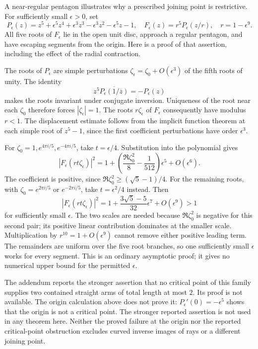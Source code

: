 A near-regular pentagon illustrates why a prescribed joining point is
restrictive. For sufficiently small $\epsilon>0$, set
\[
 P_\epsilon(z)=z^5+\epsilon^5z^4+\epsilon^3z^3
              -\epsilon^3z^2-\epsilon^5z-1,
 \quad F_\epsilon(z)=r^5P_\epsilon(z/r),\quad r=1-\epsilon^9.
\]
All five roots of $F_\epsilon$ lie in the open unit disc, approach a
regular pentagon, and have escaping segments from the origin. Here is a
proof of that assertion, including the effect of the radial contraction.

The roots of $P_\epsilon$ are simple perturbations
$\zeta_\epsilon=\zeta_0+O(\epsilon^3)$ of the fifth roots of unity.
The identity
\[
 z^5\overline{P_\epsilon(1/\overline z)}=-P_\epsilon(z)
\]
makes the roots invariant under conjugate inversion. Uniqueness of the
root near each $\zeta_0$ therefore forces $|\zeta_\epsilon|=1$.
The roots $r\zeta_\epsilon$ of $F_\epsilon$ consequently have modulus
$r<1$. The displacement estimate follows from the implicit function
theorem at each simple root of $z^5-1$, since the first coefficient
perturbations have order $\epsilon^3$.

For $\zeta_0=1,e^{4\pi i/5},e^{-4\pi i/5}$, take $t=\epsilon/4$.
Substitution into the polynomial gives
\[
 |F_\epsilon(rt\zeta_\epsilon)|^2
 =1+\left(\frac{\Re\zeta_0^2}{8}-\frac1{512}\right)\epsilon^5
       +O(\epsilon^6).
\]
The coefficient is positive, since
$\Re\zeta_0^2\ge(\sqrt5-1)/4$.
For the remaining roots, with $\zeta_0=e^{2\pi i/5}$ or
$e^{-2\pi i/5}$, take $t=\epsilon^2/4$ instead. Then
\[
 |F_\epsilon(rt\zeta_\epsilon)|^2
 =1+\frac{3\sqrt5-5}{32}\epsilon^7+O(\epsilon^9)>1
\]
for sufficiently small $\epsilon$. The two scales are needed because
$\Re\zeta_0^2$ is negative for this second pair; its positive linear
contribution dominates at the smaller scale. Multiplication by
$r^{10}=1+O(\epsilon^9)$ cannot remove either positive leading term.
The remainders are uniform over the five root branches, so one sufficiently
small $\epsilon$ works for every segment. This is an ordinary asymptotic
proof; it gives no numerical upper bound for the permitted $\epsilon$.

The addendum \cite[Proposition~1]{revision2026} reports the stronger
assertion that no critical point of this family supplies two contained
straight arms of total length at most $2$. Its proof is not available.
The origin calculation above does not prove it: $P_\epsilon'(0)=-\epsilon^5$
shows that the origin is not a critical point. The stronger reported
assertion is not used in any theorem here. Neither the proved failure at
the origin nor the reported critical-point obstruction excludes curved
inverse images of rays or a different joining point.

